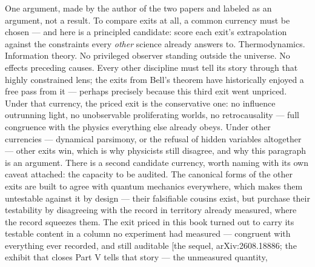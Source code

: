 \begin{ruled}

One argument, made by the author of the two papers and labeled as an
argument, not a result. To compare exits at all, a common currency must
be chosen --- and here is a principled candidate: score each exit's extrapolation against the
constraints every \emph{other} science already answers to. Thermodynamics.
Information theory. No privileged observer standing outside the
universe. No effects preceding causes. Every other discipline must
tell its story through that highly constrained lens; the exits from
Bell's theorem have historically enjoyed a free pass from it --- perhaps
precisely because this third exit went unpriced. Under that currency,
the priced exit is the conservative one: no influence outrunning
light, no unobservable proliferating worlds, no retrocausality --- full
congruence with the physics everything else already obeys. Under
other currencies --- dynamical parsimony, or the refusal of hidden
variables altogether --- other exits win, which is why physicists still
disagree, and why this paragraph is an argument. There is a second
candidate currency, worth naming with its own caveat attached: the
capacity to be audited. The canonical forms of the other exits are
built to agree with quantum mechanics everywhere, which makes them
untestable against it by design --- their falsifiable cousins exist,
but purchase their testability by disagreeing with the record in
territory already measured, where the record squeezes them. The exit
priced in this book turned out to carry its testable content in a
column no experiment had measured --- congruent with everything ever
recorded, and still auditable {[}the sequel, arXiv:2608.18886; the
exhibit that closes Part V tells that story --- the unmeasured quantity,

\end{ruled}
